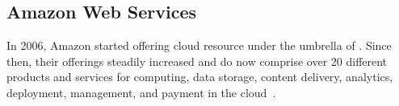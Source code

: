 \subsection{Amazon Web Services}

In 2006, Amazon started offering cloud resource under the umbrella of .
Since then, their offerings steadily increased and do now comprise over 20 different products and services for computing, data storage, content delivery, analytics, deployment, management, and payment in the cloud~\autocite{aws:about}.
